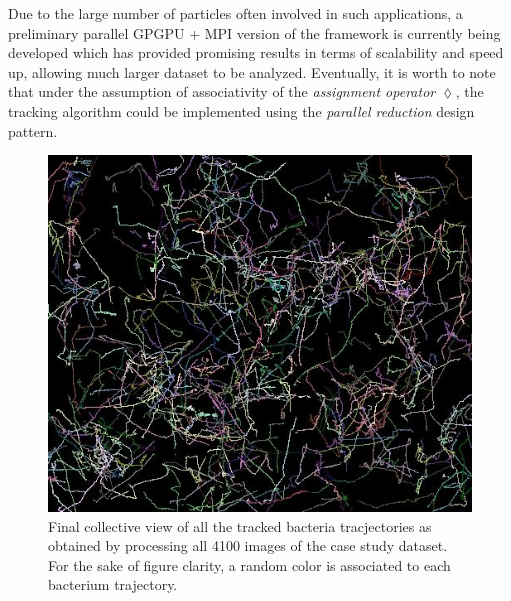 \documentclass[conference]{IEEEtran}
\begin{document}
Due to the large number of particles often involved in such applications, a preliminary parallel GPGPU + MPI version of the framework is currently being developed which has provided promising results in terms of scalability and speed up, allowing much larger dataset to be analyzed. Eventually, it is worth to note that under the assumption of associativity of the \textit{assignment operator} $\lozenge$, the tracking algorithm could be implemented using the \textit{parallel reduction} design pattern.


    \begin{figure}[h]
      \begin{center}
        \includegraphics[scale=0.5]{./images/result.png}
        \caption{Final collective view of all the tracked bacteria tracjectories as obtained by processing all 4100 images of the case study dataset. For the sake of figure clarity, a random color is associated to each bacterium trajectory.}\label{fig:}
        
      \end{center}
    \end{figure}


\end{document}
